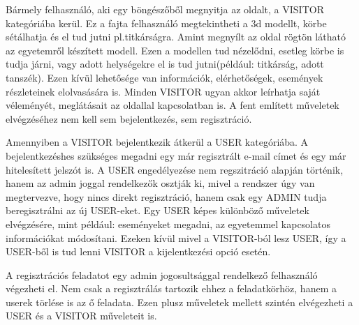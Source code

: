 Bármely felhasználó, aki egy böngészőből megnyitja az oldalt, a VISITOR kategóriába kerül. Ez a fajta felhasználó megtekintheti a 3d modellt, körbe sétálhatja és el tud jutni pl.titkárságra. Amint megnyílt az oldal rögtön látható az egyetemről készített modell. Ezen a modellen tud nézelődni, esetleg körbe is tudja járni, vagy adott helységekre el is tud jutni(például: titkárság, adott tanszék). Ezen kívül lehetősége van információk, elérhetőségek, események részleteinek elolvasására is. Minden VISITOR ugyan akkor leírhatja saját véleményét, meglátásait az oldallal kapcsolatban is. A fent említett műveletek elvégzéséhez nem kell sem bejelentkezés, sem regisztráció.

Amennyiben a VISITOR bejelentkezik átkerül a USER kategóriába. A bejelentkezéshes szükséges megadni egy már regisztrált e-mail címet és egy már hitelesített jelszót is. A USER engedélyezése nem regszitráció alapján történik, hanem az admin joggal rendelkezők osztják ki, mivel a rendszer úgy van megtervezve, hogy nincs direkt regisztráció, hanem csak egy ADMIN tudja beregisztrálni az új USER-eket. Egy USER képes különböző műveletek elvégzésére, mint például: eseményeket megadni, az egyetemmel kapcsolatos információkat módosítani. Ezeken kívül mivel a VISITOR-ból lesz USER, így a USER-ből is tud lenni VISITOR a kijelentkezési opció esetén.

A regisztrációs feladatot egy admin jogosultsággal rendelkező felhasználó végezheti el. Nem csak a regisztrálás tartozik ehhez a feladatkörhöz, hanem a userek törlése is az ő feladata. Ezen plusz műveletek mellett szintén elvégezheti a USER és a VISITOR műveleteit is.